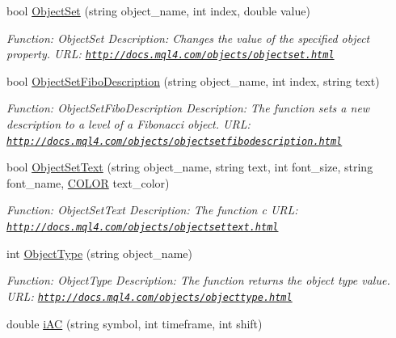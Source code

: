 \begin{DoxyCompactItemize}
bool \hyperlink{class_m_q_l4_c_sharp_1_1_base_1_1_m_q_l_base_acac685af735829f5721cddafb534b242}{Object\+Set} (string object\+\_\+name, int index, double value)
\begin{DoxyCompactList}\small\item\em Function\+: Object\+Set Description\+: Changes the value of the specified object property. U\+RL\+: \href{http://docs.mql4.com/objects/objectset.html}{\tt http\+://docs.\+mql4.\+com/objects/objectset.\+html} \end{DoxyCompactList}\item 
bool \hyperlink{class_m_q_l4_c_sharp_1_1_base_1_1_m_q_l_base_ae94aad543d5ae75607a42cfe151cd3e1}{Object\+Set\+Fibo\+Description} (string object\+\_\+name, int index, string text)
\begin{DoxyCompactList}\small\item\em Function\+: Object\+Set\+Fibo\+Description Description\+: The function sets a new description to a level of a Fibonacci object. U\+RL\+: \href{http://docs.mql4.com/objects/objectsetfibodescription.html}{\tt http\+://docs.\+mql4.\+com/objects/objectsetfibodescription.\+html} \end{DoxyCompactList}\item 
bool \hyperlink{class_m_q_l4_c_sharp_1_1_base_1_1_m_q_l_base_a66fa72f6098f717645f8bfb66c7982cd}{Object\+Set\+Text} (string object\+\_\+name, string text, int font\+\_\+size, string font\+\_\+name, \hyperlink{namespace_m_q_l4_c_sharp_1_1_base_1_1_enums_a79b99235c71c70f2f5207aac2ff24f1a}{C\+O\+L\+OR} text\+\_\+color)
\begin{DoxyCompactList}\small\item\em Function\+: Object\+Set\+Text Description\+: The function c U\+RL\+: \href{http://docs.mql4.com/objects/objectsettext.html}{\tt http\+://docs.\+mql4.\+com/objects/objectsettext.\+html} \end{DoxyCompactList}\item 
int \hyperlink{class_m_q_l4_c_sharp_1_1_base_1_1_m_q_l_base_ade342eec44ed8ad425e67247c54c4571}{Object\+Type} (string object\+\_\+name)
\begin{DoxyCompactList}\small\item\em Function\+: Object\+Type Description\+: The function returns the object type value. U\+RL\+: \href{http://docs.mql4.com/objects/objecttype.html}{\tt http\+://docs.\+mql4.\+com/objects/objecttype.\+html} \end{DoxyCompactList}\item 
double \hyperlink{class_m_q_l4_c_sharp_1_1_base_1_1_m_q_l_base_a557dbdaf016761c7069a9e3b2e31a4a7}{i\+AC} (string symbol, int timeframe, int shift)

\end{DoxyCompactItemize}
